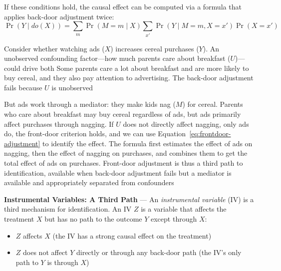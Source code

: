 If these conditions hold, the causal effect can be computed via a formula that applies
back-door adjustment twice:
\begin{equation}
  \Pr(Y \mid do(X)) = \sum_{m}\Pr(M = m \mid X) \sum_{x'}\Pr(Y \mid M = m, X = x
  ') \Pr(X = x') \label{eq:frontdoor-adjustment}
\end{equation}

Consider whether watching ads ($X$) increases cereal purchases ($Y$). An
unobserved confounding factor—how much parents care about breakfast ($U$)—could drive
both Some parents care a lot about breakfast and are more likely to buy cereal,
and they also pay attention to advertising. The back-door adjustment fails because
$U$ is unobserved

But ads work through a mediator: they make kids nag ($M$) for cereal. Parents
who care about breakfast may buy cereal regardless of ads, but ads primarily affect
purchases through nagging. If $U$ does not directly affect nagging, only ads do,
the front-door criterion holds, and we can use Equation~\eqref{eq:frontdoor-adjustment}
to identify the effect. The formula first estimates the effect of ads on nagging,
then the effect of nagging on purchases, and combines them to get the total effect
of ads on purchases. Front-door adjustment is thus a third path to
identification, available when back-door adjustment fails but a mediator is available
and appropriately separated from confounders


\textbf{Instrumental Variables: A Third Path} --- An \emph{instrumental variable}
(IV) is a third mechanism for identification. An IV $Z$ is a variable that
affects the treatment $X$ but has no path to the outcome $Y$ except through $X$:

\begin{itemize}
  \item $Z$ affects $X$ (the IV has a strong causal effect on the treatment)

  \item $Z$ does not affect $Y$ directly or through any back-door path (the IV's
    only path to $Y$ is through $X$)
\end{itemize}

